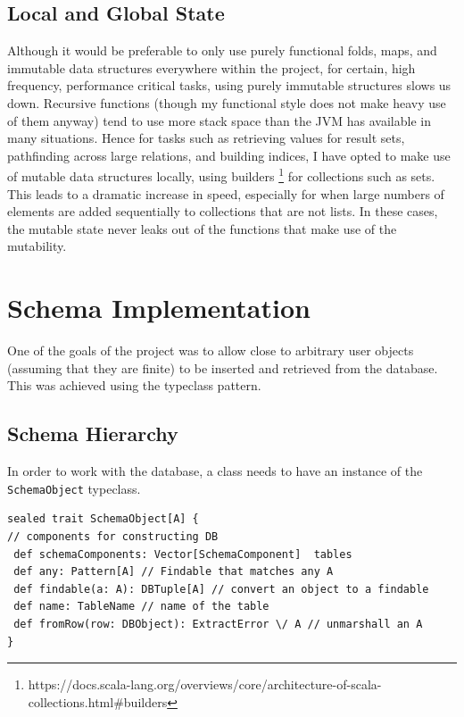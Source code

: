 \documentclass[12pt,a4paper,twoside,openright]{report}
\newcommand\codeName[1]{\texttt{#1}}
\renewcommand{\baselinestretch}{1.1}    %
\begin{document}
	
	\subsection{Local and Global State}
Although it would be preferable to only use purely functional folds, maps, and immutable data structures everywhere within the project, for certain, high frequency, performance critical tasks, using purely immutable structures slows us down. Recursive functions (though my functional style does not make heavy use of them anyway) tend to use more stack space than the JVM has available in many situations. Hence for tasks such as retrieving values for result sets,  pathfinding across large relations, and building indices, I have opted to make use of mutable data structures locally, using builders \footnote{https://docs.scala-lang.org/overviews/core/architecture-of-scala-collections.html\#builders} for collections such as sets. This leads to a dramatic increase in speed, especially for when large numbers of elements are added sequentially to collections that are not lists. In these cases, the mutable state never leaks out of the functions that make use of the mutability.	
	
\section{Schema Implementation}
	One of the goals of the project was to allow close to arbitrary user objects (assuming that they are finite) to be inserted and retrieved from the database. This was achieved using the typeclass pattern.
	\subsection{Schema Hierarchy}
	In order to work with the database, a class needs to have an instance of the \codeName{SchemaObject} typeclass.

\renewcommand{\baselinestretch}{0.8}
	\begin{framed}
		\begin{verbatim}
sealed trait SchemaObject[A] {
// components for constructing DB
 def schemaComponents: Vector[SchemaComponent]  tables
 def any: Pattern[A] // Findable that matches any A
 def findable(a: A): DBTuple[A] // convert an object to a findable
 def name: TableName // name of the table
 def fromRow(row: DBObject): ExtractError \/ A // unmarshall an A
}
		\end{verbatim}
	\end{framed}
\renewcommand{\baselinestretch}{1.1}
	
\end{document}
